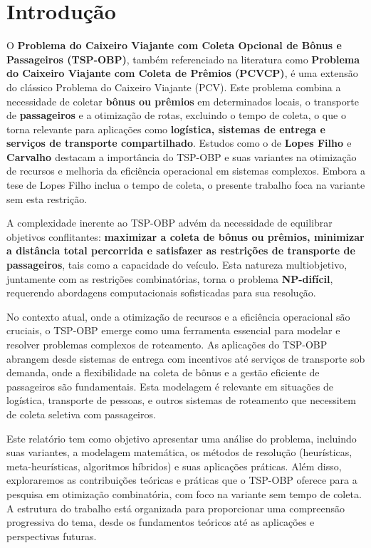\documentclass[12pt, a4paper]{report}
\begin{document}

\newpage
\tableofcontents
\thispagestyle{empty}
\newpage
\setcounter{page}{1}
\pagestyle{plain}


\section*{Introdução}

O \textbf{Problema do Caixeiro Viajante com Coleta Opcional de Bônus e Passageiros (TSP-OBP)}, também referenciado na literatura como \textbf{Problema do Caixeiro Viajante com Coleta de Prêmios (PCVCP)}, é uma extensão do clássico Problema do Caixeiro Viajante (PCV). Este problema combina a necessidade de coletar \textbf{bônus ou prêmios} em determinados locais, o transporte de \textbf{passageiros} e a otimização de rotas, excluindo o tempo de coleta, o que o torna relevante para aplicações como \textbf{logística, sistemas de entrega e serviços de transporte compartilhado}. Estudos como o de \textbf{Lopes Filho \cite{lopesfilho2019}} e \textbf{Carvalho \cite{carvalho2022}} destacam a importância do TSP-OBP e suas variantes na otimização de recursos e melhoria da eficiência operacional em sistemas complexos. Embora a tese de Lopes Filho \cite{lopesfilho2019} inclua o tempo de coleta, o presente trabalho foca na variante sem esta restrição.

A complexidade inerente ao TSP-OBP advém da necessidade de equilibrar objetivos conflitantes: \textbf{maximizar a coleta de bônus ou prêmios, minimizar a distância total percorrida e satisfazer as restrições de transporte de passageiros}, tais como a capacidade do veículo. Esta natureza multiobjetivo, juntamente com as restrições combinatórias, torna o problema \textbf{NP-difícil}, requerendo abordagens computacionais sofisticadas para sua resolução.

No contexto atual, onde a otimização de recursos e a eficiência operacional são cruciais, o TSP-OBP emerge como uma ferramenta essencial para modelar e resolver problemas complexos de roteamento. As aplicações do TSP-OBP abrangem desde sistemas de entrega com incentivos até serviços de transporte sob demanda, onde a flexibilidade na coleta de bônus e a gestão eficiente de passageiros são fundamentais. Esta modelagem é relevante em situações de logística, transporte de pessoas,  e outros sistemas de roteamento que necessitem de coleta seletiva com passageiros.

Este relatório tem como objetivo apresentar uma análise do problema, incluindo suas variantes, a modelagem matemática, os métodos de resolução (heurísticas, meta-heurísticas, algoritmos híbridos) e suas aplicações práticas. Além disso, exploraremos as contribuições teóricas e práticas que o TSP-OBP oferece para a pesquisa em otimização combinatória, com foco na variante sem tempo de coleta. A estrutura do trabalho está organizada para proporcionar uma compreensão progressiva do tema, desde os fundamentos teóricos até as aplicações e perspectivas futuras.
\end{document}
